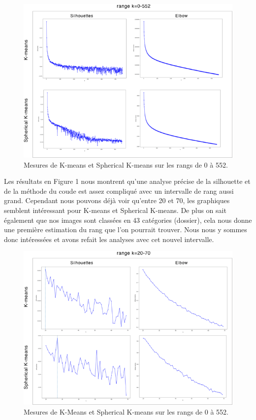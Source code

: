 \documentclass[runningheads]{llncs}
\begin{document}
\begin{figure}[H]
\centering
\includegraphics[width=1\textwidth]{552.png}
\caption{Mesures de K-means et Spherical K-means sur les rangs de 0 à 552.}
  \label{fig:552}
\end{figure}

Les résultats en Figure 1 nous montrent qu'une analyse précise de la silhouette et de la méthode du coude est assez compliqué avec un intervalle de rang aussi grand. Cependant nous pouvons déjà voir qu'entre 20 et 70, les graphiques semblent intéressant pour K-means et Spherical K-means. De plus on sait également que nos images sont classées en 43 catégories (dossier), cela nous donne une première estimation du rang que l'on pourrait trouver. 
Nous nous y sommes donc intéressées et avons refait les analyses avec cet nouvel intervalle.


\begin{figure}[H]
\centering
\includegraphics[width=1\textwidth]{70.png}
\caption{Mesures de K-Means et Spherical K-means sur les rangs de 0 à 552.}
  \label{fig:70}
\end{figure}
\end{document}
